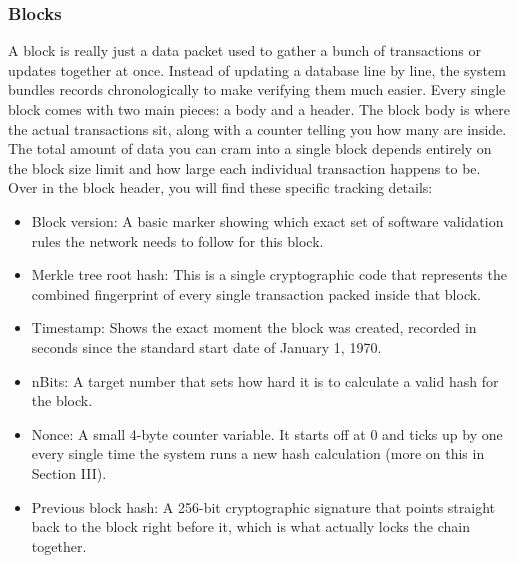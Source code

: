 

\subsubsection{Blocks}
A block is really just a data packet used to gather a bunch of transactions or updates together at once. Instead of updating a database line by line, the system bundles records chronologically to make verifying them much easier. Every single block comes with two main pieces: a body and a header. The block body is where the actual transactions sit, along with a counter telling you how many are inside. The total amount of data you can cram into a single block depends entirely on the block size limit and how large each individual transaction happens to be\cite{zheng2017blockchain}. Over in the block header, you will find these specific tracking details:

\begin{itemize}
    \item Block version: A basic marker showing which exact set of software validation rules the network needs to follow for this block\cite{zheng2017blockchain}.

    \item Merkle tree root hash: This is a single cryptographic code that represents the combined fingerprint of every single transaction packed inside that block\cite{zheng2017blockchain}.

    \item Timestamp: Shows the exact moment the block was created, recorded in seconds since the standard start date of January 1, 1970\cite{zheng2017blockchain}.

    \item nBits: A target number that sets how hard it is to calculate a valid hash for the block\cite{zheng2017blockchain}.

    \item Nonce: A small 4-byte counter variable. It starts off at 0 and ticks up by one every single time the system runs a new hash calculation (more on this in Section III)\cite{zheng2017blockchain}.

    \item Previous block hash: A 256-bit cryptographic signature that points straight back to the block right before it, which is what actually locks the chain together\cite{zheng2017blockchain}.
\end{itemize}

